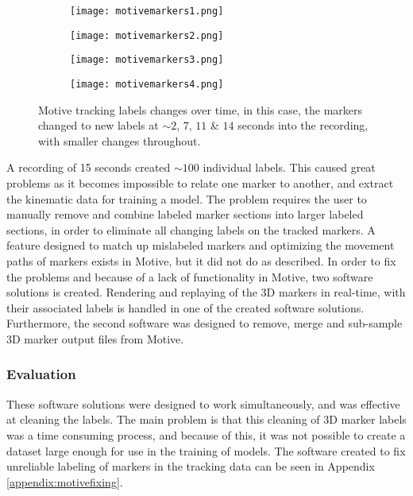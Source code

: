 \documentclass[../main.tex]{subfiles}
\begin{document}
\begin{figure}[H]
    \centering
    \begin{subfigure}[b]{0.49\textwidth}
        \centering
        \texttt{[image: motivemarkers1.png]}
    \end{subfigure}
    \hfill
    \centering
    \begin{subfigure}[b]{0.49\textwidth}
        \centering
        \texttt{[image: motivemarkers2.png]}
    \end{subfigure}
    \hfill
    \begin{subfigure}[b]{0.49\textwidth}
        \centering
        \texttt{[image: motivemarkers3.png]}
    \end{subfigure}
    \hfill
    \begin{subfigure}[b]{0.49\textwidth}
        \centering
        \texttt{[image: motivemarkers4.png]}
    \end{subfigure}
    \caption{Motive tracking labels changes over time, in this case, the markers changed to new labels at $\sim 2$, $7$, $11$ \& $14$ seconds into the recording, with smaller changes throughout.}
    \label{fig:motivelabels}
\end{figure}

A recording of 15 seconds created $\sim 100$ individual labels.
This caused great problems as it becomes impossible to relate one marker to another, and extract the kinematic data for training a model.
The problem requires the user to manually remove and combine labeled marker sections into larger labeled sections, in order to eliminate all changing labels on the tracked markers.
A feature designed to match up mislabeled markers and optimizing the movement paths of markers exists in Motive, but it did not do as described.
In order to fix the problems and because of a lack of functionality in Motive, two software solutions is created.
Rendering and replaying of the 3D markers in real-time, with their associated labels is handled in one of the created software solutions.
Furthermore, the second software was designed to remove, merge and sub-sample 3D marker output files from Motive.

\subsubsection{Evaluation}

These software solutions were designed to work simultaneously, and was effective at cleaning the labels.
The main problem is that this cleaning of 3D marker labels was a time consuming process, and because of this, it was not possible to create a dataset large enough for use in the training of models.
The software created to fix unreliable labeling of markers in the tracking data can be seen in Appendix \ref{appendix:motivefixing}.
\end{document}

